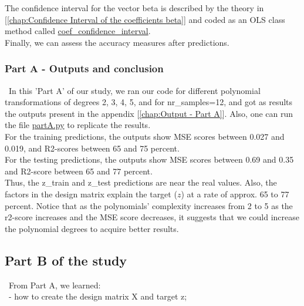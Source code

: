 The confidence interval for the vector beta is described by the theory in [\ref{chap:Confidence Interval of the coefficients beta}] and coded as an OLS class method called \href{https://github.com/fabiorodp/UiO-FYS-STK4155/blob/master/Project1/package/Create_data.py}{coef\_confidence\_interval}.\\

Finally, we can assess the accuracy measures after predictions.\\

\subsubsection{Part A - Outputs and conclusion}
\label{chap:Part A - Outputs and conclusion}

\quad \, In this 'Part A' of our study, we ran our code for different polynomial transformations of degrees 2, 3, 4, 5, and for nr\_samples=12, and got as results the outputs present in the appendix [\ref{chap:Output - Part A}]. Also, one can run the file \href{https://github.com/fabiorodp/UiO-FYS-STK4155/blob/master/Project1/partA.py}{partA.py} to replicate the results.\\

For the training predictions, the outputs show MSE scores between 0.027 and 0.019, and R2-scores between 65 and 75 percent.\\

For the testing predictions, the outputs show MSE scores between 0.69 and 0.35 and R2-score between 65 and 77 percent.\\

Thus, the z\_train and z\_test predictions are near the real values. Also, the factors in the design matrix explain the target ($z$) at a rate of approx. 65 to 77 percent. Notice that as the polynomials' complexity increases from 2 to 5 as the r2-score increases and the MSE score decreases, it suggests that we could increase the polynomial degrees to acquire better results.\\

\subsection{Part B of the study}
\label{chap:Part B of the study}

\quad \, From Part A, we learned:\\

\quad \, - how to create the design matrix X and target z;\\ 

